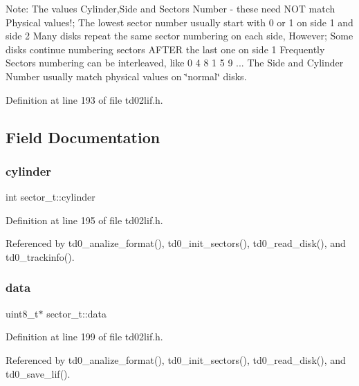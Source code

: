 Note\+: The values Cylinder,Side and Sectors Number -\/ these need N\+OT match Physical values!; The lowest sector number usually start with 0 or 1 on side 1 and side 2 Many disks repeat the same sector numbering on each side, However; Some disks continue numbering sectors A\+F\+T\+ER the last one on side 1 Frequently Sectors numbering can be interleaved, like 0 4 8 1 5 9 ... The Side and Cylinder Number usually match physical values on \char`\"{}normal\char`\"{} disks. 

Definition at line 193 of file td02lif.\+h.



\subsection{Field Documentation}
\mbox{\label{structsector__t_abf5eb245097466ac9624e59a379a2409}} 
\subsubsection{\texorpdfstring{cylinder}{cylinder}}
{\footnotesize\ttfamily int sector\+\_\+t\+::cylinder}



Definition at line 195 of file td02lif.\+h.



Referenced by td0\+\_\+analize\+\_\+format(), td0\+\_\+init\+\_\+sectors(), td0\+\_\+read\+\_\+disk(), and td0\+\_\+trackinfo().

\mbox{\label{structsector__t_a3a7122a3121eb84094a889be7e6ed042}} 
\subsubsection{\texorpdfstring{data}{data}}
{\footnotesize\ttfamily uint8\+\_\+t$\ast$ sector\+\_\+t\+::data}



Definition at line 199 of file td02lif.\+h.



Referenced by td0\+\_\+analize\+\_\+format(), td0\+\_\+init\+\_\+sectors(), td0\+\_\+read\+\_\+disk(), and td0\+\_\+save\+\_\+lif().

